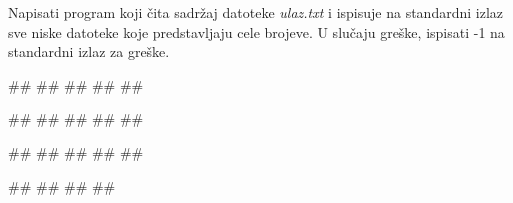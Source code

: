 \begin{Exercise}[label=A_o_2_3] 
Napisati program koji čita sadržaj datoteke \textit{ulaz.txt} i ispisuje na standardni izlaz sve niske datoteke koje predstavljaju cele brojeve. U slučaju greške, ispisati -1 na standardni izlaz za greške. 

\begin{minitest}
\begin{test}{1}

##
##
##
#\naslovIzlaz#
##
\end{test}
\end{minitest}
\begin{minitest}
\begin{test}{2}

##
##
##
#\naslovIzlaz#
##
\end{test}
\end{minitest}
\begin{minitest}
\begin{test}{3}

##
##
##
#\naslovIzlaz#
#\izlaz{}#
\end{test}
\end{minitest}

\begin{minitest}
\begin{test}{4}

##
##
#\naslovIzlazZaGresku#
##
\end{test}
\end{minitest}

\end{Exercise}

\ifresenja
\begin{Answer}[ref=A_o_2_3]
\end{Answer}
\fi


